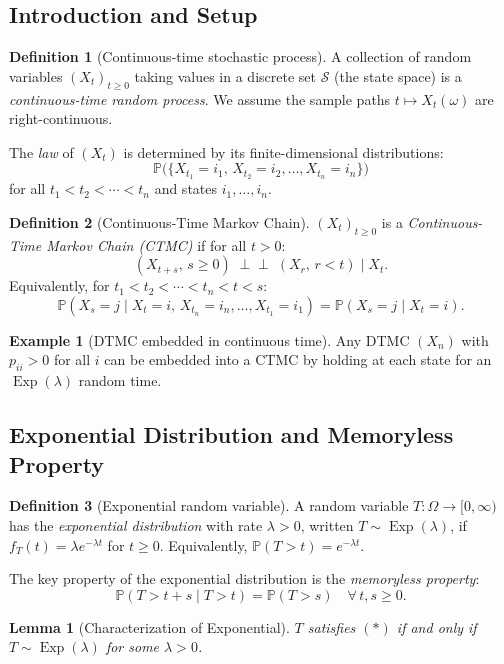\documentclass[12pt, a4paper]{article}
\theoremstyle{definition}
\newtheorem{definition}{Definition}[section]
\newtheorem{example}{Example}[section]
\theoremstyle{plain}
\newtheorem{lemma}{Lemma}[section]
\DeclareMathOperator{\Exp}{Exp}
\newcommand{\PP}{\mathbb{P}}
\begin{document}
\subsection{Introduction and Setup}

\begin{definition}[Continuous-time stochastic process]
A collection of random variables $(X_t)_{t\ge 0}$ taking values in a discrete set $\mathcal{S}$ (the state space) is a \emph{continuous-time random process}. We assume the sample paths $t\mapsto X_t(\omega)$ are right-continuous.

The \emph{law} of $(X_t)$ is determined by its finite-dimensional distributions:
\[
  \PP\bigl(\{X_{t_1}=i_1,\,X_{t_2}=i_2,\ldots,X_{t_n}=i_n\}\bigr)
\]
for all $t_1<t_2<\cdots<t_n$ and states $i_1,\ldots,i_n$.
\end{definition}

\begin{definition}[Continuous-Time Markov Chain]
$(X_t)_{t\ge 0}$ is a \emph{Continuous-Time Markov Chain (CTMC)} if for all $t>0$:
\[
  (X_{t+s},\,s\ge 0)\;\perp\!\!\!\perp\;(X_r,\,r<t)\;\big|\;X_t.
\]
Equivalently, for $t_1<t_2<\cdots<t_n<t<s$:
\[
  \PP(X_s=j\mid X_t=i,\,X_{t_n}=i_n,\ldots,X_{t_1}=i_1) = \PP(X_s=j\mid X_t=i).
\]
\end{definition}

\begin{example}[DTMC embedded in continuous time]
Any DTMC $(X_n)$ with $p_{ii}>0$ for all $i$ can be embedded into a CTMC by holding at each state for an $\Exp(\lambda)$ random time.
\end{example}

\subsection{Exponential Distribution and Memoryless Property}

\begin{definition}[Exponential random variable]
A random variable $T:\Omega\to[0,\infty)$ has the \emph{exponential distribution} with rate $\lambda>0$, written $T\sim\Exp(\lambda)$, if $f_T(t)=\lambda e^{-\lambda t}$ for $t\ge 0$. Equivalently, $\PP(T>t)=e^{-\lambda t}$.
\end{definition}

The key property of the exponential distribution is the \emph{memoryless property}:
\[
  \PP(T>t+s\mid T>t) = \PP(T>s) \quad \forall\,t,s\ge 0. \tag{$*$}
\]

\begin{lemma}[Characterization of Exponential]
$T$ satisfies $(*)$ if and only if $T\sim\Exp(\lambda)$ for some $\lambda>0$.
\end{lemma}
\end{document}

